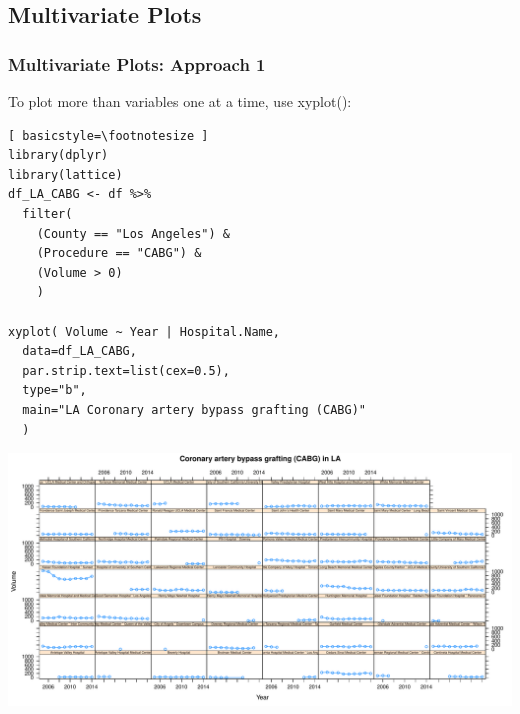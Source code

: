 

\subsection{Multivariate Plots}


\begin{frame}
 \frametitle{Multivariate Plots: Approach 1}

To plot more than variables one at a time, use \ttfamily xyplot()\normalfont [5]:
		\begin{lstlisting}[ basicstyle=\footnotesize ]
library(dplyr)
library(lattice)
df_LA_CABG <- df %>%
  filter( 
    (County == "Los Angeles") & 
    (Procedure == "CABG") & 
    (Volume > 0) 
    )

xyplot( Volume ~ Year | Hospital.Name, 
  data=df_LA_CABG,
  par.strip.text=list(cex=0.5),
  type="b",
  main="LA Coronary artery bypass grafting (CABG)"
  )
		\end{lstlisting}

\newpage
      \vspace{-10pt} \hspace{-10pt}
         \includegraphics[width=1.05\textwidth]{images/timeseries_LA_CABG}

\end{frame}

